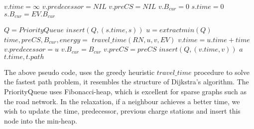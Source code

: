 \begin{algorithm}[!htb]
\begin{algorithmic}[1]
        \State $v.time = \infty$
        \State $v.predecessor = NIL$
        \State $v.preCS = NIL$
        \State $v.B_{cur} = 0$
    \EndFor
    \State $s.time = 0$
    \State $s.B_{cur} = EV.B_{cur}$

    \State $Q = PriorityQueue$
    \State $insert(Q, (s.time, s))$ 
        \State $u = extractmin(Q)$
            \State $time,preCS,B_{cur},energy = $
            \State $travel\_time(RN, u, v, EV)$
                \State $v.time = u.time + time$
                \State $v.predecessor = u$
                \State $v.B_{cur} = B_{cur}$
                \State $v.preCS = preCS$
                \State $insert(Q, (v.time, v))$ 
            \EndIf
                \State $a$
            \EndIf
        \EndFor
    \EndWhile
    \State \Return $t.time, t.path$
\EndFunction
\end{algorithmic}\label{alg:fastest_path}
\end{algorithm}

The above pseudo code, uses the greedy heuristic $travel\_time$ procedure to solve the fastest path problem, it resembles the structure of Dijkstra's algorithm. The PriorityQueue uses Fibonacci-heap, which is excellent for sparse graphs such as the road network. In the relaxation, if a neighbour achieves a better time, we wish to update the time, predecessor, previous charge stations and insert this node into the min-heap.


